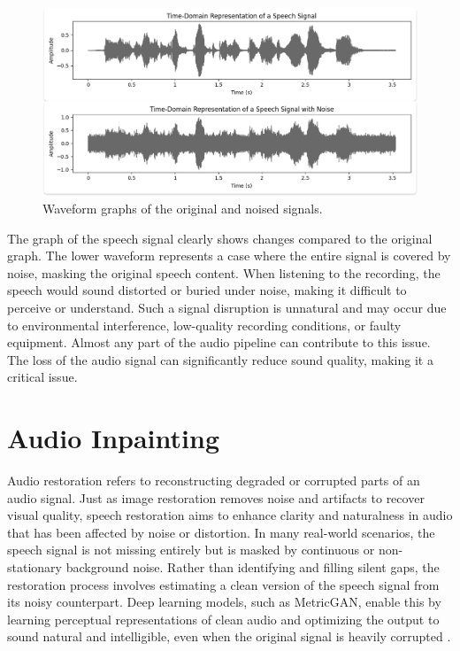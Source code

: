 \begin{figure}[htbp]
    \centering
    \includegraphics[width=0.8\linewidth]{figures/signal-with-a-gap.png}
     \caption{Waveform graphs of the original and noised signals.}
    \label{fig:figure4}
\end{figure}


The graph of the speech signal clearly shows changes compared to the original graph. 
 The lower waveform represents a case where the entire signal is covered by noise, masking the original speech content. When listening to the recording, the speech would sound distorted or buried under noise, making it difficult to perceive or understand. Such a signal disruption is unnatural and may occur due to environmental interference, low-quality recording conditions, or faulty equipment. Almost any part of the audio pipeline can contribute to this issue.
The loss of the audio signal can significantly reduce sound quality, making it a critical issue.


\section{Audio Inpainting}

Audio restoration refers to reconstructing degraded or corrupted parts of an audio signal. Just as image restoration removes noise and artifacts to recover visual quality, speech restoration aims to enhance clarity and naturalness in audio that has been affected by noise or distortion. In many real-world scenarios, the speech signal is not missing entirely but is masked by continuous or non-stationary background noise. Rather than identifying and filling silent gaps, the restoration process involves estimating a clean version of the speech signal from its noisy counterpart. Deep learning models, such as MetricGAN, enable this by learning perceptual representations of clean audio and optimizing the output to sound natural and intelligible, even when the original signal is heavily corrupted \cite{miotello}.


